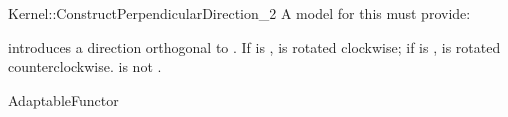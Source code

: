 \begin{ccRefFunctionObjectConcept}{Kernel::ConstructPerpendicularDirection_2}
A model for this must provide:


            {introduces a direction orthogonal to . If  is
             ,  is rotated clockwise; if  is
             ,  is rotated counterclockwise.
             \ccPrecond {} is not .}

\ccRefines
AdaptableFunctor

\ccSeeAlso
{} \\

\end{ccRefFunctionObjectConcept}
